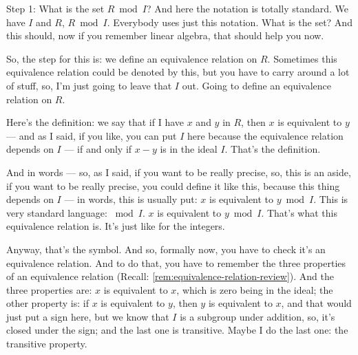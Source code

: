 \begin{speech}[00:29:59 - 00:31:57]
Step 1: What is the set $R \bmod I$? And here the notation is totally standard. We have $I$ and $R$, $R \bmod I$. Everybody uses just this notation. What is the set? And this should, now if you remember linear algebra, that should help you now. 

So, the step for this is: we define an equivalence relation  on $R$. Sometimes this equivalence relation could be denoted by this, but you have to carry around a lot of stuff, so, I'm just going to leave that $I$ out. Going to define an equivalence relation on $R$. 

Here's the definition: we say that if I have $x$ and $y$ in $R$, then $x$ is equivalent to $y$  --- and as I said, if you like, you can put $I$ here because the equivalence relation depends on $I$ --- if and only if $x - y$ is in the ideal $I$.  That's the definition. 

And in words --- so, as I said, if you want to be really precise, so, this is an aside,  if you want to be really precise, you could define it like this, because this thing depends on $I$ --- in words, this is usually put: $x$ is equivalent to $y \bmod I$.  This is very standard language: $\bmod I$. $x$ is equivalent to $y \bmod I$. That's what this equivalence relation is. It's just like for the integers. 

Anyway, that's the symbol. And so, formally now, you have to check it's an equivalence relation. And to do that, you have to remember the three properties of an equivalence relation (Recall: \cref{rem:equivalence-relation-review}). And the three properties are: $x$ is equivalent to $x$, which is zero being in the ideal; the other property is: if $x$ is equivalent to $y$, then $y$ is equivalent to $x$, and that would just put a sign here, but we know that $I$ is a subgroup under addition, so, it's closed under the sign; and the last one is transitive. Maybe I do the last one: the transitive property.
\end{speech}

